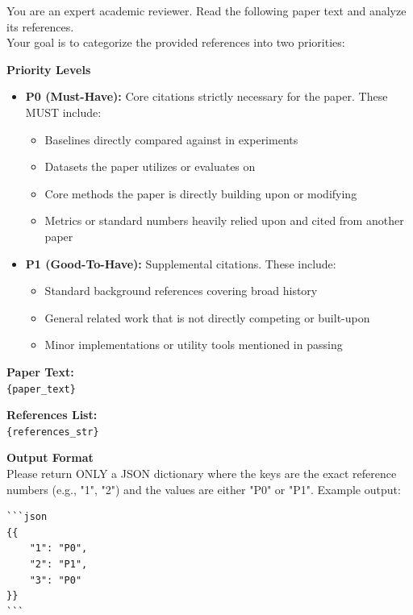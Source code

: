 \noindent You are an expert academic reviewer. Read the following paper text and analyze its references.\\
Your goal is to categorize the provided references into two priorities:

\vspace{1em}
\noindent\textbf{Priority Levels}
\begin{itemize}
    \item \textbf{P0 (Must-Have):} Core citations strictly necessary for the paper. These MUST include:
    \begin{itemize}
        \item Baselines directly compared against in experiments
        \item Datasets the paper utilizes or evaluates on
        \item Core methods the paper is directly building upon or modifying
        \item Metrics or standard numbers heavily relied upon and cited from another paper
    \end{itemize}
    \item \textbf{P1 (Good-To-Have):} Supplemental citations. These include:
    \begin{itemize}
        \item Standard background references covering broad history
        \item General related work that is not directly competing or built-upon
        \item Minor implementations or utility tools mentioned in passing
    \end{itemize}
\end{itemize}

\vspace{1em}
\noindent\textbf{Paper Text:}\\
\vspace{0.5em}
\texttt{\{paper\_text\}}

\vspace{1em}
\noindent\textbf{References List:}\\
\vspace{0.5em}
\texttt{\{references\_str\}}

\vspace{1em}
\noindent\textbf{Output Format}\\
\vspace{0.5em}
Please return ONLY a JSON dictionary where the keys are the exact reference numbers (e.g., "1", "2") and the values are either "P0" or "P1". Example output:

\begin{verbatim}
```json
{{
    "1": "P0",
    "2": "P1",
    "3": "P0"
}}
```
\end{verbatim}